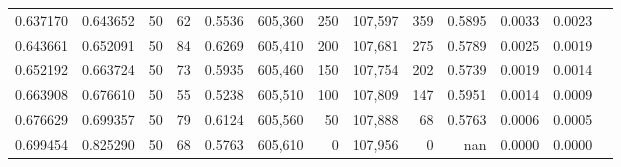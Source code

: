 \begin{tabular}{rrrrrrrrrrrrr}
0.637170 & 0.643652 &    50 &  62 &                                     0.5536 & 605,360 &     250 & 107,597 &     359 & 0.5895 & 0.0033 & 0.0023 \\
0.643661 & 0.652091 &    50 &  84 &                                     0.6269 & 605,410 &     200 & 107,681 &     275 & 0.5789 & 0.0025 & 0.0019 \\
0.652192 & 0.663724 &    50 &  73 &                                     0.5935 & 605,460 &     150 & 107,754 &     202 & 0.5739 & 0.0019 & 0.0014 \\
0.663908 & 0.676610 &    50 &  55 &                                     0.5238 & 605,510 &     100 & 107,809 &     147 & 0.5951 & 0.0014 & 0.0009 \\
0.676629 & 0.699357 &    50 &  79 &                                     0.6124 & 605,560 &      50 & 107,888 &      68 & 0.5763 & 0.0006 & 0.0005 \\
0.699454 & 0.825290 &    50 &  68 &                                     0.5763 & 605,610 &       0 & 107,956 &       0 &    nan & 0.0000 & 0.0000 \\
\bottomrule
\end{tabular}
